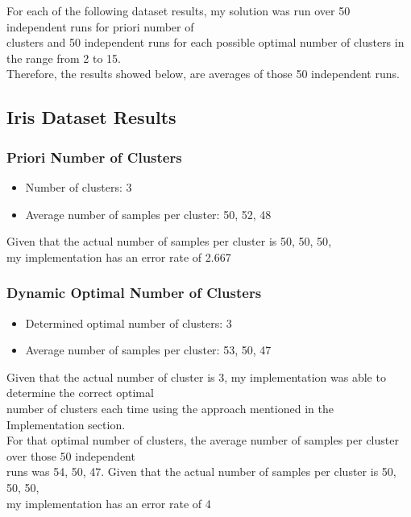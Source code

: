\begin{flushleft}
    For each of the following dataset results, my solution was run over 50 independent runs for priori number of \\
    clusters and 50 independent runs for each possible optimal number of clusters in the range from 2 to 15. \\
    Therefore, the results showed below, are averages of those 50 independent runs.\\
    \subsection{Iris Dataset Results}
        \subsubsection{Priori Number of Clusters}
            \begin{itemize}
                \item Number of clusters: 3
                \item Average number of samples per cluster: {50, 52, 48}
            \end{itemize}
            Given that the actual number of samples per cluster is {50, 50, 50}, \\
            my implementation has an error rate of 2.667%
        \subsubsection{Dynamic Optimal Number of Clusters}
            \begin{itemize}
                \item Determined optimal number of clusters: 3
                \item Average number of samples per cluster: {53, 50, 47}
            \end{itemize}
            Given that the actual number of cluster is 3, my implementation was able to determine the correct optimal \\
            number of clusters each time using the approach mentioned in the Implementation section. \\
            For that optimal number of clusters, the average number of samples per cluster over those 50 independent \\
            runs was {54, 50, 47}. Given that the actual number of samples per cluster is {50, 50, 50}, \\
            my implementation has an error rate of 4%


\end{flushleft}
